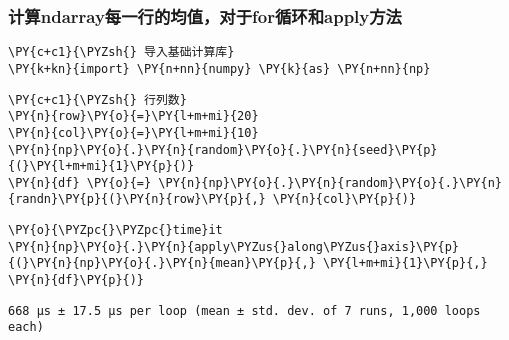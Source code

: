     \hypertarget{ux8ba1ux7b97ndarrayux6bcfux4e00ux884cux7684ux5747ux503cux5bf9ux4e8eforux5faaux73afux548capplyux65b9ux6cd5}{%
\subsubsection{计算ndarray每一行的均值，对于for循环和apply方法}\label{ux8ba1ux7b97ndarrayux6bcfux4e00ux884cux7684ux5747ux503cux5bf9ux4e8eforux5faaux73afux548capplyux65b9ux6cd5}}

    \begin{tcolorbox}[breakable, size=fbox, boxrule=1pt, pad at break*=1mm,colback=cellbackground, colframe=cellborder]
\begin{Verbatim}[commandchars=\\\{\}]
\PY{c+c1}{\PYZsh{} 导入基础计算库}
\PY{k+kn}{import} \PY{n+nn}{numpy} \PY{k}{as} \PY{n+nn}{np}
\end{Verbatim}
\end{tcolorbox}

    \begin{tcolorbox}[breakable, size=fbox, boxrule=1pt, pad at break*=1mm,colback=cellbackground, colframe=cellborder]
\begin{Verbatim}[commandchars=\\\{\}]
\PY{c+c1}{\PYZsh{} 行列数}
\PY{n}{row}\PY{o}{=}\PY{l+m+mi}{20}
\PY{n}{col}\PY{o}{=}\PY{l+m+mi}{10}
\PY{n}{np}\PY{o}{.}\PY{n}{random}\PY{o}{.}\PY{n}{seed}\PY{p}{(}\PY{l+m+mi}{1}\PY{p}{)}
\PY{n}{df} \PY{o}{=} \PY{n}{np}\PY{o}{.}\PY{n}{random}\PY{o}{.}\PY{n}{randn}\PY{p}{(}\PY{n}{row}\PY{p}{,} \PY{n}{col}\PY{p}{)}
\end{Verbatim}
\end{tcolorbox}

    \begin{tcolorbox}[breakable, size=fbox, boxrule=1pt, pad at break*=1mm,colback=cellbackground, colframe=cellborder]
\begin{Verbatim}[commandchars=\\\{\}]
\PY{o}{\PYZpc{}\PYZpc{}time}it
\PY{n}{np}\PY{o}{.}\PY{n}{apply\PYZus{}along\PYZus{}axis}\PY{p}{(}\PY{n}{np}\PY{o}{.}\PY{n}{mean}\PY{p}{,} \PY{l+m+mi}{1}\PY{p}{,} \PY{n}{df}\PY{p}{)}
\end{Verbatim}
\end{tcolorbox}

    \begin{Verbatim}[commandchars=\\\{\}]
668 µs ± 17.5 µs per loop (mean ± std. dev. of 7 runs, 1,000 loops each)
    \end{Verbatim}

